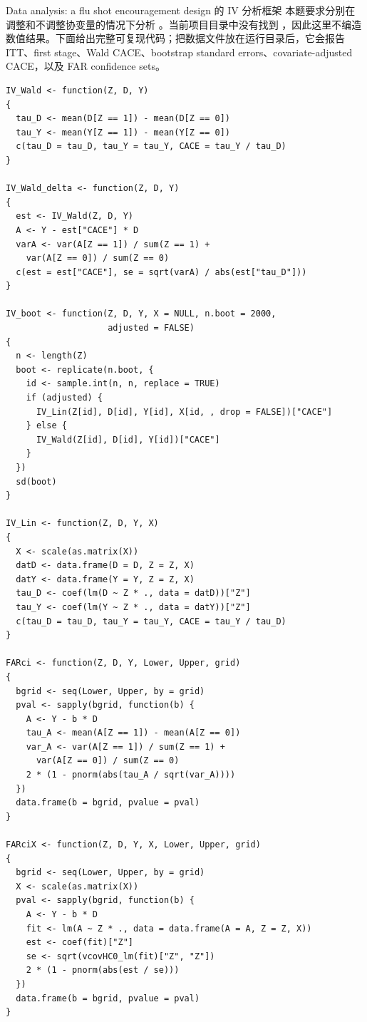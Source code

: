 \begin{exercisesolution}{Data analysis: a flu shot encouragement design \citep{mcdonald1992effects}}{ 的 IV 分析框架}
本题要求分别在调整和不调整协变量的情况下分析 。当前项目目录中没有找到 ，因此这里不编造数值结果。下面给出完整可复现代码；把数据文件放在运行目录后，它会报告 ITT、first stage、Wald CACE、bootstrap standard errors、covariate-adjusted CACE，以及 FAR confidence sets。

\begin{lstlisting}
IV_Wald <- function(Z, D, Y)
{
  tau_D <- mean(D[Z == 1]) - mean(D[Z == 0])
  tau_Y <- mean(Y[Z == 1]) - mean(Y[Z == 0])
  c(tau_D = tau_D, tau_Y = tau_Y, CACE = tau_Y / tau_D)
}

IV_Wald_delta <- function(Z, D, Y)
{
  est <- IV_Wald(Z, D, Y)
  A <- Y - est["CACE"] * D
  varA <- var(A[Z == 1]) / sum(Z == 1) +
    var(A[Z == 0]) / sum(Z == 0)
  c(est = est["CACE"], se = sqrt(varA) / abs(est["tau_D"]))
}

IV_boot <- function(Z, D, Y, X = NULL, n.boot = 2000,
                    adjusted = FALSE)
{
  n <- length(Z)
  boot <- replicate(n.boot, {
    id <- sample.int(n, n, replace = TRUE)
    if (adjusted) {
      IV_Lin(Z[id], D[id], Y[id], X[id, , drop = FALSE])["CACE"]
    } else {
      IV_Wald(Z[id], D[id], Y[id])["CACE"]
    }
  })
  sd(boot)
}

IV_Lin <- function(Z, D, Y, X)
{
  X <- scale(as.matrix(X))
  datD <- data.frame(D = D, Z = Z, X)
  datY <- data.frame(Y = Y, Z = Z, X)
  tau_D <- coef(lm(D ~ Z * ., data = datD))["Z"]
  tau_Y <- coef(lm(Y ~ Z * ., data = datY))["Z"]
  c(tau_D = tau_D, tau_Y = tau_Y, CACE = tau_Y / tau_D)
}

FARci <- function(Z, D, Y, Lower, Upper, grid)
{
  bgrid <- seq(Lower, Upper, by = grid)
  pval <- sapply(bgrid, function(b) {
    A <- Y - b * D
    tau_A <- mean(A[Z == 1]) - mean(A[Z == 0])
    var_A <- var(A[Z == 1]) / sum(Z == 1) +
      var(A[Z == 0]) / sum(Z == 0)
    2 * (1 - pnorm(abs(tau_A / sqrt(var_A))))
  })
  data.frame(b = bgrid, pvalue = pval)
}

FARciX <- function(Z, D, Y, X, Lower, Upper, grid)
{
  bgrid <- seq(Lower, Upper, by = grid)
  X <- scale(as.matrix(X))
  pval <- sapply(bgrid, function(b) {
    A <- Y - b * D
    fit <- lm(A ~ Z * ., data = data.frame(A = A, Z = Z, X))
    est <- coef(fit)["Z"]
    se <- sqrt(vcovHC0_lm(fit)["Z", "Z"])
    2 * (1 - pnorm(abs(est / se)))
  })
  data.frame(b = bgrid, pvalue = pval)
}


\end{lstlisting}
\end{exercisesolution}
